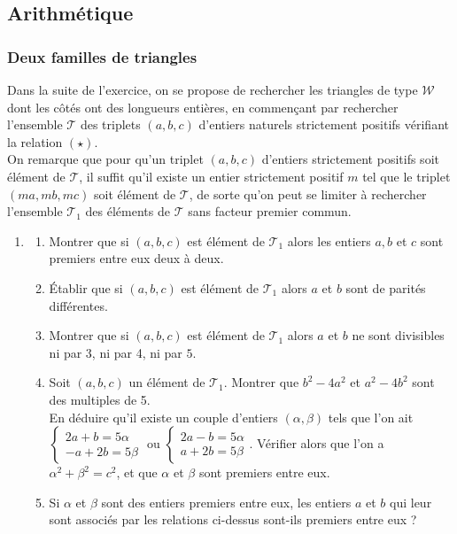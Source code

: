 \documentclass[landscape,twocolumn,leqno,a4paper,10pt]{report} %
\newcommand\n{\noindent}
\newcommand*{\syst}[2]{%
  \left\{\begin{array}{ll} 
        #1\\ 
        #2 
      \end{array}  
    \right. }
\begin{document}
\subsection{Arithmétique}

\subsubsection{Deux familles de triangles}

\n Dans la suite de l'exercice, on se propose de rechercher les triangles de type $\mathscr{W}$ dont les côtés ont des longueurs entières, en commençant par rechercher l'ensemble $\mathscr{T}$ des triplets $(a, b, c)$ d'entiers naturels strictement positifs vérifiant la relation $(\star)$.\\

\n On remarque que pour qu'un triplet $(a, b, c)$ d'entiers strictement positifs soit élément de $\mathscr{T}$, il suffit qu'il existe un entier strictement positif $m$ tel que le triplet $(m a, m b, m c)$ soit élément de $\mathscr{T}$, de sorte qu'on peut se limiter à rechercher l'ensemble $\mathscr{T}_{1}$ des éléments de $\mathscr{T}$ sans facteur premier commun.

\begin{enumerate}
	\item \begin{enumerate}
		\item Montrer que si $(a, b, c)$ est élément de $\mathscr{T}_{1}$ alors les entiers $a, b$ et $c$ sont premiers entre eux deux à deux.
		\item Établir que si $(a, b, c)$ est élément de $\mathscr{T}_{1}$ alors $a$ et $b$ sont de parités différentes.
		\item Montrer que si $(a, b, c)$ est élément de $\mathscr{T}_{1}$ alors $a$ et $b$ ne sont divisibles ni par 3, ni par 4, ni par $5$.
		\item Soit $(a, b, c)$ un élément de $\mathscr{T}_{1}$. Montrer que $b^{2}-4 a^{2}$ et $a^{2}-4 b^{2}$ sont des multiples de 5.\\
		En déduire qu'il existe un couple d'entiers $(\alpha, \beta)$ tels que l'on ait $\syst{2 a+b=5 \alpha}{-a+2 b=5 \beta}$ ou $\syst{2 a-b=5 \alpha}{a+2 b=5 \beta}$. Vérifier alors que l'on a $\alpha^{2}+\beta^{2}=c^{2}$, et que $\alpha$ et $\beta$ sont premiers entre eux.
		\item Si $\alpha$ et $\beta$ sont des entiers premiers entre eux, les entiers $a$ et $b$ qui leur sont associés par les relations ci-dessus sont-ils premiers entre eux ?
	\end{enumerate}
\end{enumerate}
\end{document}
